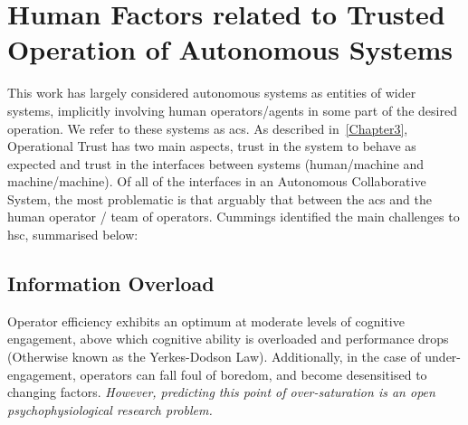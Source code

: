 
\chapter{Human Factors related to Trusted Operation of Autonomous Systems}
\label{apx:human_factors}

This work has largely considered autonomous systems as entities of wider systems, implicitly involving human operators/agents in some part of the desired operation.
We refer to these systems as \gls{acs}.
As described in~\autoref{Chapter3}, Operational Trust has two main aspects, trust in the system to behave as expected and trust in the interfaces between systems (human/machine and machine/machine).
Of all of the interfaces in an Autonomous Collaborative System, the most problematic is that arguably that between the \gls{acs} and the human operator / team of operators.
Cummings identified the main challenges to \gls{hsc}, summarised below:\cite{Cummings2010}

\section{Information Overload}
Operator efficiency exhibits an optimum at moderate levels of cognitive engagement, above which cognitive ability is overloaded and performance drops (Otherwise known as the Yerkes-Dodson Law).
Additionally, in the case of under-engagement, operators can fall foul of boredom, and become desensitised to changing factors.
\textit{However, predicting this point of over-saturation is an open psychophysiological research problem.}

